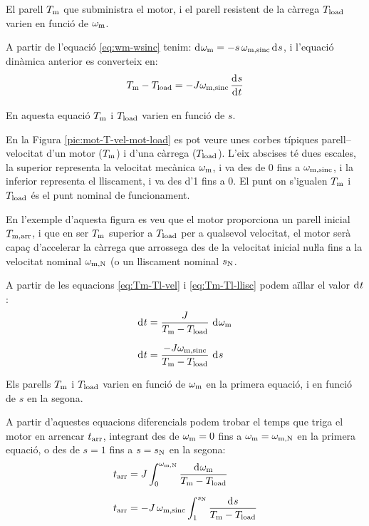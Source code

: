 El parell $T_\mathrm{m}$ que subministra el motor, i el parell resistent de la càrrega $T_\mathrm{load}$ varien en funció de $\omega_\mathrm{m}$.

A partir de l'equació \eqref{eq:wm-wsinc} tenim: $\diff \omega\ped{m} = -s\,\omega\ped{m,sinc} \diff s$, i l'equació dinàmica anterior es converteix en:
\begin{equation}\label{eq:Tm-Tl-llisc}
    T\ped{m} - T\ped{load} = -J \omega\ped{m,sinc}\,\frac{\diff s}{\diff t}
\end{equation}

En aquesta equació $T_\mathrm{m}$ i $T_\mathrm{load}$ varien en funció de $s$.


En la Figura \vref{pic:mot-T-vel-mot-load} es pot veure unes corbes típiques parell--velocitat d'un motor ($T_\mathrm{m}$) i d'una  càrrega ($T_\mathrm{load}$). L'eix abscises té dues escales, la superior representa la velocitat mecànica $\omega_\mathrm{m}$, i va des de 0 fins a $\omega_\mathrm{m,sinc}$, i la inferior representa el lliscament, i va des d'1 fins a 0. El punt on s'igualen $T_\mathrm{m}$ i $T_\mathrm{load}$ és el punt nominal de funcionament.

En l'exemple d'aquesta figura es veu que el motor proporciona un parell inicial $T_\mathrm{m,arr}$, i que en ser $T_\mathrm{m}$  superior a $T_\mathrm{load}$ per a qualsevol velocitat, el motor serà  capaç d'accelerar la càrrega que arrossega des de la velocitat inicial nuŀla fins a la velocitat nominal $\omega_\mathrm{m,N}$ (o un lliscament nominal $s_\mathrm{N}$.
\begin{center}
    
    \label{pic:mot-T-vel-mot-load}
\end{center}

A partir de les equacions \eqref{eq:Tm-Tl-vel} i \eqref{eq:Tm-Tl-llisc} podem aïllar el valor $\diff t$:
\begin{subequations}
\begin{align}
    \diff t &= \frac{J}{T\ped{m}-T\ped{load}}\,\diff\omega\ped{m}\\[1.5ex]
    \diff t &= \frac{-J \omega\ped{m,sinc}}{T\ped{m}-T\ped{load}}\,\diff s
\end{align}
\end{subequations}

Els parells $T_\mathrm{m}$ i $T_\mathrm{load}$ varien en funció de $\omega_\mathrm{m}$ en la primera equació, i en funció de $s$ en la segona.

A partir d'aquestes equacions diferencials podem trobar el temps que triga el motor en arrencar $t_\mathrm{arr}$, integrant des de $\omega_\mathrm{m}=0$ fins a $\omega_\mathrm{m}=\omega_\mathrm{m,N}$ en la primera equació, o des de $s = 1$ fins a $s = s_\mathrm{N}$ en la segona:
\begin{subequations}
\begin{align}
    t\ped{arr} &= J\int_{0}^{\omega\ped{m,N}} \frac{\diff\omega\ped{m}}{T\ped{m}-T\ped{load}}\label{eq:tarr-mot}\\[1.5ex]
    t\ped{arr} &= - J\,\omega\ped{m,sinc} \int_{1}^{s\ped{N}} \frac{\diff s}{T\ped{m}-T\ped{load}}
\end{align}
\end{subequations}

